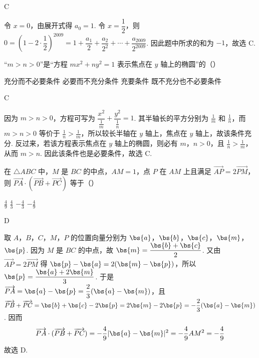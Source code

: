 \begin{answer}
C
\end{answer}

\begin{solution}
令 \(x=0\)，由展开式得 \(a_{0}=1\). 令 \(x=\dfrac{1}{2}\)，则 \(0=(1-2\cdot\dfrac{1}{2})^{2009}=1+\dfrac{a_{1}}{2}+\dfrac{a_{2}}{2^{2}}+\cdots+\dfrac{a_{2009}}{2^{2009}}\). 因此题中所求的和为 \(-1\)，故选 C.
\end{solution}

\begin{problem}
“\(m > n > 0\)”是“方程 \(mx^{2} + ny^{2} = 1\) 表示焦点在 \(y\) 轴上的椭圆”的（\quad）

\choices
    {充分而不必要条件}
    {必要而不充分条件}
    {充要条件}
    {既不充分也不必要条件}
\end{problem}

\begin{answer}
C
\end{answer}

\begin{solution}
因为 \(m>n>0\)，方程可写为 \(\dfrac{x^{2}}{\frac{1}{m}}+\dfrac{y^{2}}{\frac{1}{n}}=1\). 其半轴长的平方分别为 \(\frac{1}{m}\) 和 \(\frac{1}{n}\)，而 \(m>n>0\) 等价于 \(\frac{1}{n}>\frac{1}{m}\)，所以较长半轴在 \(y\) 轴上，焦点在 \(y\) 轴上，故该条件充分. 反过来，若该方程表示焦点在 \(y\) 轴上的椭圆，则必有 \(m\)，\(n>0\)，且 \(\frac{1}{n}>\frac{1}{m}\)，从而 \(m>n\). 因此该条件也是必要条件，故选 C.
\end{solution}

\begin{problem}
在 \(\triangle ABC\) 中，\(M\) 是 \(BC\) 的中点，\(AM = 1\)，点 \(P\) 在 \(AM\) 上且满足 \(\overrightarrow{AP} = 2\overrightarrow{PM}\)，则 \(\overrightarrow{PA} \cdot (\overrightarrow{PB} + \overrightarrow{PC})\) 等于（\quad）

\choices
    {\( \frac{4}{9} \)}
    {\( \frac{4}{3} \)}
    {\(-\frac{4}{3}\)}
    {\(-\frac{4}{9}\)}
\end{problem}

\begin{answer}
D
\end{answer}

\begin{solution}
取 \(A\)，\(B\)，\(C\)，\(M\)，\(P\) 的位置向量分别为 \(\bs{a}\)，\(\bs{b}\)，\(\bs{c}\)，\(\bs{m}\)，\(\bs{p}\). 因为 \(M\) 是 \(BC\) 的中点，故 \(\bs{m}=\dfrac{\bs{b}+\bs{c}}{2}\). 又由 \(\overrightarrow{AP}=2\overrightarrow{PM}\) 得 \(\bs{p}-\bs{a}=2(\bs{m}-\bs{p})\)，所以 \(\bs{p}=\dfrac{\bs{a}+2\bs{m}}{3}\). 于是 \(\overrightarrow{PA}=\bs{a}-\bs{p}=\dfrac{2}{3}(\bs{a}-\bs{m})\)，且 \(\overrightarrow{PB}+\overrightarrow{PC}=\bs{b}+\bs{c}-2\bs{p}=2\bs{m}-2\bs{p}=-\dfrac{2}{3}(\bs{a}-\bs{m})\). 因而
\[
\overrightarrow{PA}\cdot(\overrightarrow{PB}+\overrightarrow{PC})=-\dfrac{4}{9}|\bs{a}-\bs{m}|^{2}=-\dfrac{4}{9}AM^{2}=-\dfrac{4}{9}
\]
故选 D.
\end{solution}

